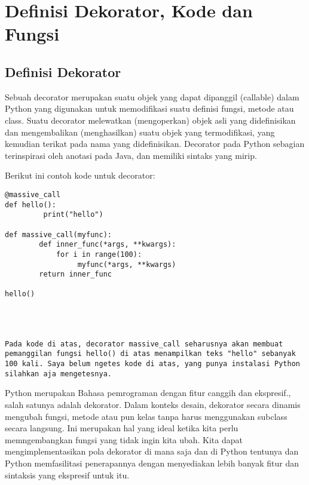 



\section{Definisi Dekorator, Kode dan Fungsi}



\subsection{Definisi Dekorator}

Sebuah decorator merupakan suatu objek yang dapat dipanggil (callable) dalam Python yang digunakan untuk memodifikasi suatu definisi fungsi, metode atau class. Suatu decorator melewatkan (mengoperkan) objek asli yang didefinisikan dan mengembalikan (menghasilkan) suatu objek yang termodifikasi, yang kemudian terikat pada nama yang didefinisikan. Decorator pada Python sebagian terinspirasi oleh anotasi pada Java, dan memiliki sintaks yang mirip.
 
Berikut ini contoh kode untuk decorator:
 
 \begin{verbatim}
@massive_call
def hello():
         print("hello")
 
def massive_call(myfunc):
        def inner_func(*args, **kwargs):
            for i in range(100):
                 myfunc(*args, **kwargs)
        return inner_func
 
hello()



 
Pada kode di atas, decorator massive_call seharusnya akan membuat pemanggilan fungsi hello() di atas menampilkan teks "hello" sebanyak 100 kali. Saya belum ngetes kode di atas, yang punya instalasi Python silahkan aja mengetesnya.

\end{verbatim}


Python merupakan Bahasa pemrograman dengan fitur canggih dan ekspresif., salah satunya adalah dekorator. Dalam konteks desain, dekorator secara dinamis mengubah fungsi, metode atau pun kelas tanpa harus menggunakan subclass secara langsung. Ini merupakan hal yang ideal ketika kita perlu memngembangkan fungsi yang tidak ingin kita ubah. Kita dapat mengimplementasikan pola dekorator di mana saja dan di Python tentunya  dan Python memfasilitasi penerapannya dengan menyediakan lebih banyak fitur dan sintaksis yang ekspresif untuk itu. 



